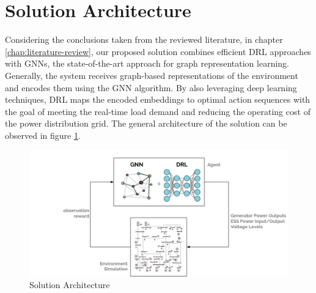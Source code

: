 \section{Solution Architecture} \label{sec:arch}

Considering the conclusions taken from the reviewed literature, in chapter \ref{chap:literature-review}, our proposed solution combines efficient \acf{DRL} approaches with \acfp{GNN}, the state-of-the-art approach for graph representation learning. Generally, the system receives graph-based representations of the environment and encodes them using the \ac{GNN} algorithm. By also leveraging deep learning techniques, \ac{DRL} maps the encoded embeddings to optimal action sequences with the goal of meeting the real-time load demand and reducing the operating cost of the power distribution grid. The general architecture of the solution can be observed in figure \ref{fig:arch}.

\begin{figure}
	\centering
	\includegraphics[width=0.85\linewidth]{./figures/arch.png}
	\caption{Solution Architecture}
	\label{fig:arch}
\end{figure}


